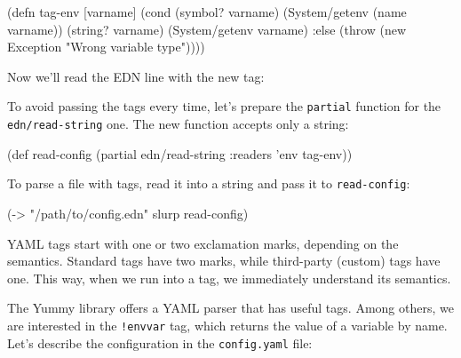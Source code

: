 \else

\begin{clojure}
(defn tag-env
  [varname]
  (cond
    (symbol? varname)
    (System/getenv (name varname))
    (string? varname)
    (System/getenv varname)
    :else
    (throw (new Exception "Wrong variable type"))))
\end{clojure}

\fi

\noindent
Now we'll read the EDN line with the new tag:

\ifx\DEVICETYPE\MOBILE

\begin{clojure}
(require '[clojure.edn :as edn])

(edn/read-string
  {:readers {'env tag-env}}
  "{:db-password #env DB_PASS}")
;; {:db-password "*(&fd}A53z#$!"}
\end{clojure}

\else

\begin{clojure}
(require '[clojure.edn :as edn])

(edn/read-string {:readers {'env tag-env}}
                 "{:db-password #env DB_PASS}")
;; {:db-password "*(&fd}A53z#$!"}
\end{clojure}

\fi

To avoid passing the tags every time, let's prepare the \verb|partial| function for the \verb|edn/read-string| one. The new function accepts only a string:

\begin{clojure}
(def read-config
  (partial edn/read-string
           {:readers {'env tag-env}}))
\end{clojure}

To parse a file with tags, read it into a string and pass it to \verb|read-config|:

\begin{clojure}
(-> "/path/to/config.edn"
    slurp
    read-config)
\end{clojure}

YAML tags start with one or two exclamation marks, depending on the semantics. Standard tags have two marks, while third-party (custom) tags have one. This way, when we run into a tag, we immediately understand its semantics.


The Yummy library offers a YAML parser that has useful tags. Among others, we are interested in the \verb|!envvar| tag, which returns the value of a variable by name. Let's describe the configuration in the \verb|config.yaml| file:

